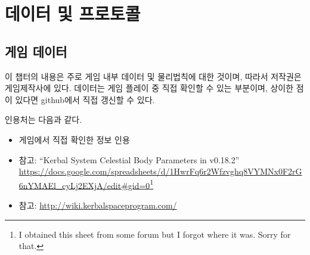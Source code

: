 \part{데이터 및 프로토콜}
\chapter{게임 데이터}
이 챕터의 내용은 주로 게임 내부 데이터 및 물리법칙에 대한 것이며, 
따라서 저작권은 게임제작사에 있다.%
데이터는 게임 플레이 중 직접 확인할 수 있는 부분이며, 상이한 점이 있다면 github에서 직접 갱신할 수 있다.

인용처는 다음과 같다.
\begin{itemize}
\item 게임에서 직접 확인한 정보 인용
\item 참고: ``Kerbal System Celestial Body Parameters in v0.18.2'' \url{https://docs.google.com/spreadsheets/d/1HwrFq6r2Wfzvghq8VYMNx0F2rG6nYMAEl_cyLj2EXjA/edit#gid=0}\footnote{I obtained this sheet from some forum but I forgot where it was. Sorry for that.}
\item 참고: \url{http://wiki.kerbalspaceprogram.com/}
\end{itemize}

